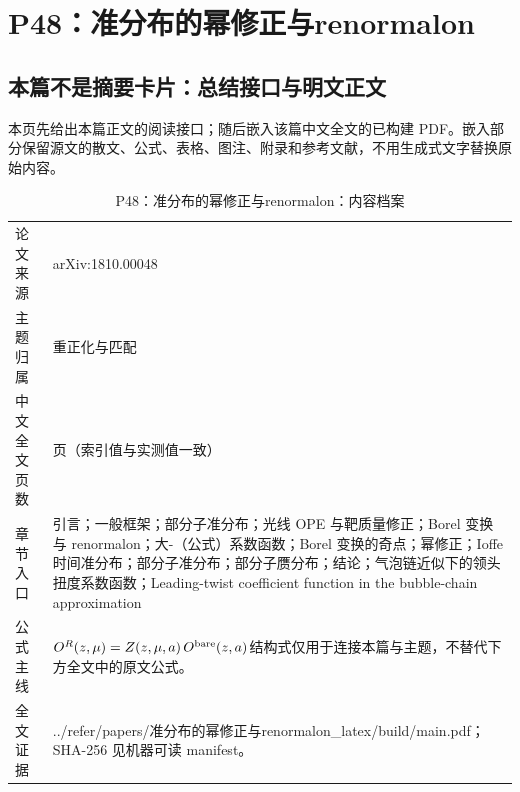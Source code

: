 \documentclass[UTF8,11pt,oneside]{ctexbook}
\begin{document}
\chapter{P48：准分布的幂修正与renormalon}
\section*{本篇不是摘要卡片：总结接口与明文正文}
本页先给出本篇正文的阅读接口；随后嵌入该篇中文全文的已构建 PDF。嵌入部分保留源文的散文、公式、表格、图注、附录和参考文献，不用生成式文字替换原始内容。
\begin{table}[htbp]
  \centering
  \caption{P48：准分布的幂修正与renormalon：内容档案}
  \small
  \begin{tabularx}{0.96\textwidth}{@{}p{3.3cm}>{\raggedright\arraybackslash}X@{}}
    \toprule
    论文来源 & arXiv:1810.00048 \\
    主题归属 & 重正化与匹配 \\
    中文全文页数 & 24 页（索引值与实测值一致） \\
    章节入口 & 引言；一般框架；部分子准分布；光线 OPE 与靶质量修正；Borel 变换与 renormalon；大-（公式）系数函数；Borel 变换的奇点；幂修正；Ioffe 时间准分布；部分子准分布；部分子赝分布；结论；气泡链近似下的领头扭度系数函数；Leading-twist coefficient function in the bubble-chain approximation \\
    公式主线 & $O^{R}(z,\mu)=Z(z,\mu,a)\,O^{\rm bare}(z,a)$\newline\scriptsize 结构式仅用于连接本篇与主题，不替代下方全文中的原文公式。 \\
    全文证据 & ../\allowbreak{}refer/\allowbreak{}papers/\allowbreak{}准分布的幂修正与renormalon\_\allowbreak{}latex/\allowbreak{}build/\allowbreak{}main.pdf；SHA-256 见机器可读 manifest。 \\
    \bottomrule
  \end{tabularx}
\end{table}
\end{document}
